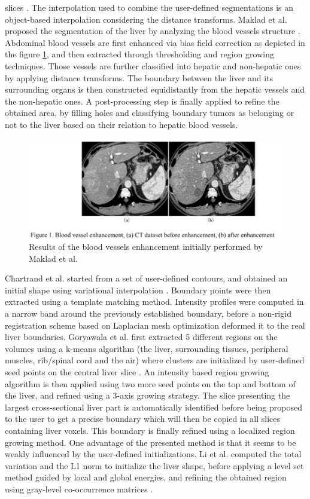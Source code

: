 \documentclass[]{article}
\begin{document}
slices \cite{Schenk2000}. The interpolation used to combine the user-defined segmentations
is an object-based interpolation considering the distance transforms.
Maklad et al. proposed the segmentation of the liver by analyzing the blood vessels
structure \cite{Maklad2013}. Abdominal blood vessels are first enhanced via bias field correction as depicted in the figure \ref{Maklad2013_Fig1}, and then extracted through thresholding
and region growing techniques. Those vessels are further classified into
hepatic and non-hepatic ones by applying distance transforms. The
boundary between the liver and its surrounding organs is then
constructed equidistantly from the hepatic vessels and the non-hepatic
ones. A post-processing step is finally applied to refine the obtained
area, by filling holes and classifying boundary tumors as belonging or
not to the liver based on their relation to hepatic blood vessels.

\begin{figure}[th!]
	\centering
	\includegraphics[width=0.7\linewidth]{images/image4}
	\caption{Results of the blood vessels enhancement initially performed by Maklad et al. \cite{Maklad2013}}
	\label{Maklad2013_Fig1}
\end{figure}

Chartrand et al. started from a set of user-defined contours, and obtained an
initial shape using variational interpolation \cite{Chatrand2014}. Boundary points were then
extracted using a template matching method. Intensity profiles were
computed in a narrow band around the previously established boundary,
before a non-rigid registration scheme based on Laplacian mesh
optimization deformed it to the real liver boundaries.
Goryawala et al. first extracted 5 different regions on the volumes using
a k-means algorithm (the liver, surrounding tissues, peripheral muscles,
rib/spinal cord and the air) where clusters are initialized by
user-defined seed points on the central liver slice \cite{Goryawala2014}. An intensity based
region growing algorithm is then applied using two more seed points on
the top and bottom of the liver, and refined using a 3-axis growing
strategy. The slice presenting the largest cross-sectional liver part is
automatically identified before being proposed to the user to get a
precise boundary which will then be copied in all slices containing
liver voxels. This boundary is finally refined using a localized region
growing method. One advantage of the presented method is that it seems
to be weakly influenced by the user-defined initializations. Li et al. computed the total variation and the L1 norm to initialize the
liver shape, before applying a level set method guided by local and
global energies, and refining the obtained region using gray-level
co-occurrence matrices \cite{Li2014b}.
\end{document}
